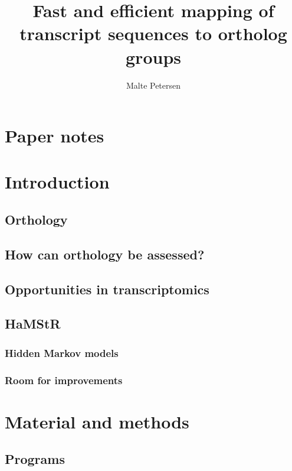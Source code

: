 \documentclass[a4paper,12.5pt]{scrreprt}
\title{Fast and efficient mapping of transcript sequences to ortholog groups}
\author{Malte Petersen}
\newcommand{\hamstr}{HaMStR\xspace}
\begin{document}
\maketitle
\tableofcontents

\chapter*{Paper notes}
	



\chapter{Introduction}
	
	\section{Orthology}
		
	\section{How can orthology be assessed?}
		
	\section{Opportunities in transcriptomics}
		
	\section{\hamstr}
		
		\subsection{Hidden Markov models}
			
		\subsection{Room for improvements}

\chapter{Material and methods}
	\section{Programs}
		
		
		
\end{document}

